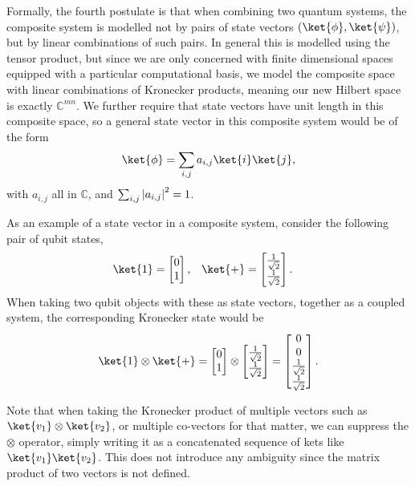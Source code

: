 Formally, the fourth postulate is that when combining two quantum systems, the composite system is modelled not by pairs of state vectors $(\ket{\phi}, \ket{\psi})$, but by linear combinations of such pairs. In general this is modelled using the tensor product, but since we are only concerned with finite dimensional spaces equipped with a particular computational basis, we model the composite space with linear combinations of Kronecker products, meaning our new Hilbert space is exactly $\mathbb{C}^{mn}$. We further require that state vectors have unit length in this composite space, so a general state vector in this composite system would be of the form
\[\ket{\phi} = \sum_{i, j} a_{i,j}\ket{i}\ket{j},\]
with $a_{i,j}$ all in $\mathbb{C}$, and $\sum_{i,j} \left| a_{i,j} \right|^2 = 1$.

As an example of a state vector in a composite system, consider the following pair of qubit states,
\begin{align*}
\ket{1} = \left[\begin{matrix}0\\1\end{matrix}\right],
&&&
\ket{+} = \left[\begin{matrix}\frac{1}{\sqrt{2}}\\\frac{1}{\sqrt{2}}\end{matrix}\right].
\end{align*}
When taking two qubit objects with these as state vectors, together as a coupled system, the corresponding Kronecker state would be
\[
\ket{1}\otimes \ket{+} = \left[\begin{matrix}0\\1\end{matrix}\right]
\otimes
\left[\begin{matrix}\frac{1}{\sqrt{2}}\\\frac{1}{\sqrt{2}}\end{matrix}\right]
=
\left[\begin{matrix}0\\0\\\frac{1}{\sqrt{2}}\\\frac{1}{\sqrt{2}}\end{matrix}\right].
\]

Note that when taking the Kronecker product of multiple vectors such as $\ket{v_1}\otimes\ket{v_2}$, or multiple co-vectors for that matter, we can suppress the $\otimes$ operator, simply writing it as a concatenated sequence of kets like $\ket{v_1}\ket{v_2}$. This does not introduce any ambiguity since the matrix product of two vectors is not defined.

